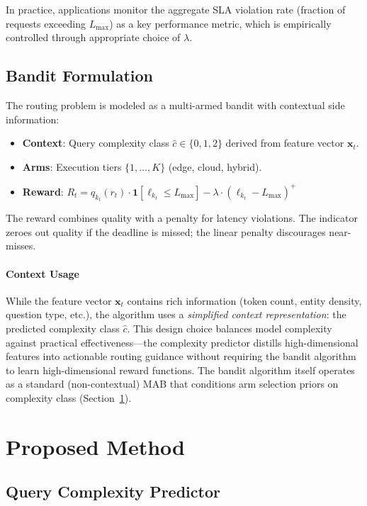 \documentclass[final,3p,twocolumn,authoryear]{elsarticle}
\theoremstyle{plain}
\theoremstyle{definition}
\begin{document}
In practice, applications monitor the aggregate SLA violation rate (fraction of requests exceeding $L_{\max}$) as a key performance metric, which is empirically controlled through appropriate choice of $\lambda$.

\subsection{Bandit Formulation}

The routing problem is modeled as a multi-armed bandit with contextual side information:
\begin{itemize}
  \item \textbf{Context}: Query complexity class $\hat{c} \in \{0, 1, 2\}$ derived from feature vector $\mathbf{x}_t$.
  \item \textbf{Arms}: Execution tiers $\{1, \ldots, K\}$ (edge, cloud, hybrid).
  \item \textbf{Reward}: $R_t = q_{k_t}(r_t) \cdot \mathbf{1}[\ell_{k_t} \leq L_{\max}] - \lambda \cdot (\ell_{k_t} - L_{\max})^+$
\end{itemize}

The reward combines quality with a penalty for latency violations.
The indicator zeroes out quality if the deadline is missed; the linear penalty discourages near-misses.

\paragraph{Context Usage}
While the feature vector $\mathbf{x}_t$ contains rich information (token count, entity density, question type, etc.), the algorithm uses a \emph{simplified context representation}: the predicted complexity class $\hat{c}$.
This design choice balances model complexity against practical effectiveness---the complexity predictor distills high-dimensional features into actionable routing guidance without requiring the bandit algorithm to learn high-dimensional reward functions.
The bandit algorithm itself operates as a standard (non-contextual) MAB that conditions arm selection priors on complexity class (Section~\ref{sec:method}).

\section{Proposed Method}
\label{sec:method}

\subsection{Query Complexity Predictor}
\label{sec:method:predictor}
\end{document}
